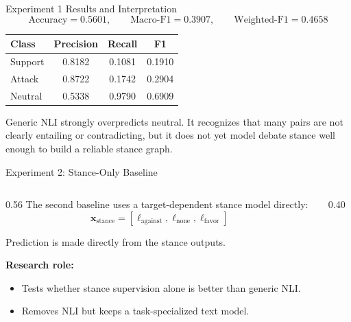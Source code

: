 \documentclass[aspectratio=169, 10pt]{beamer}
\newcommand{\takeawaybox}[2]{%
  \begin{tcolorbox}[colback=accentgreen!10, colframe=accentgreen,
    title={\textbf{Takeaway:} #1}, fonttitle=\bfseries\small,
    left=4pt, right=4pt, top=3pt, bottom=3pt, boxrule=1pt]
    \small #2
  \end{tcolorbox}}
\begin{document}
\begin{frame}{Experiment 1 Results and Interpretation}
\[
\text{Accuracy}=0.5601,\qquad
\text{Macro-F1}=0.3907,\qquad
\text{Weighted-F1}=0.4658
\]

\begin{center}
\begin{tabular}{lccc}
\toprule
Class & Precision & Recall & F1 \\
\midrule
Support & 0.8182 & 0.1081 & 0.1910 \\
Attack & 0.8722 & 0.1742 & 0.2904 \\
Neutral & 0.5338 & 0.9790 & 0.6909 \\
\bottomrule
\end{tabular}
\end{center}

\takeawaybox{Interpretation}{
Generic NLI strongly overpredicts neutral. It recognizes that many pairs are not clearly entailing or contradicting, but it does not yet model debate stance well enough to build a reliable stance graph.
}
\end{frame}

\begin{frame}{Experiment 2: Stance-Only Baseline}
  \begin{columns}[T]
    \begin{column}{0.56\textwidth}
      The second baseline uses a target-dependent stance model directly:
      \[
      \mathbf{x}_{\mathrm{stance}} =
      [\ell_{\mathrm{against}},\ell_{\mathrm{none}},\ell_{\mathrm{favor}}]
      \]

      Prediction is made directly from the stance outputs.

      \textbf{Research role:}
      \begin{itemize}
        \item Tests whether stance supervision alone is better than generic NLI.
        \item Removes NLI but keeps a task-specialized text model.
      \end{itemize}
    \end{column}
    \begin{column}{0.40\textwidth}
    \end{column}
  \end{columns}
\end{frame}
\end{document}
